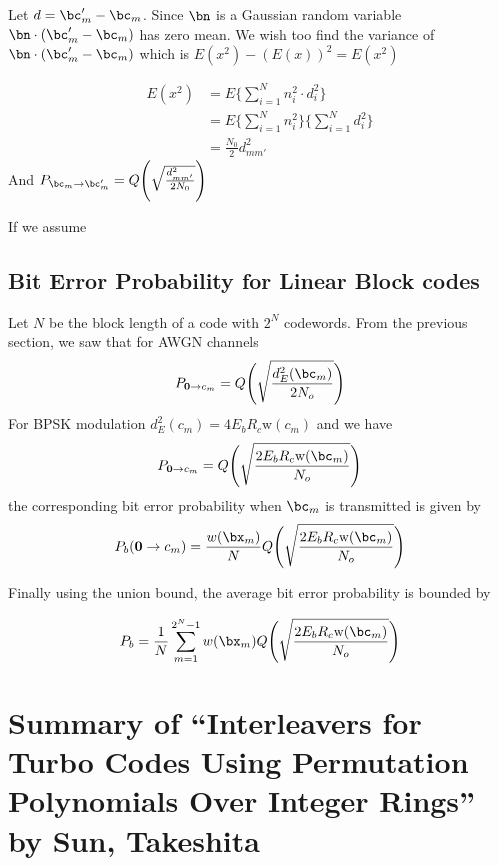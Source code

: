 \documentclass[11pt, oneside, dvipdfmx]{book}
\begin{document}
Let $d=\bc_m'-\bc_m$. Since $\bn $ is a Gaussian random variable $\bn \cdot (\bc_m'-\bc_m) $ has zero mean. We wish too find the variance of $\bn \cdot (\bc_m'-\bc_m)$ which is $E(x^2)-(E(x))^2 = E(x^2)$

\begin{equation}
\begin{split}
 E(x^2)&=E\Bigg\{ \sum_{i=1}^{N} n_i^2 \cdot d_i^2 \Bigg\}\\
 &=E\Bigg\{ \sum_{i=1}^{N} n_i^2  \Bigg\}\Bigg\{ \sum_{i=1}^{N} d_i^2 \Bigg\}\\
 &=\frac{N_0}{2}d_{mm'}^2
\end{split}
\end{equation}
And $P_{\bc_m \rightarrow \bc_m'}=Q \Bigg(\sqrt{\frac{d_{mm'}^2}{2N_0}} \Bigg)$

If we assume
\section{Bit Error Probability for Linear Block codes}
Let $N$ be the block length of a code with $2^N$ codewords. 
From the previous section, we saw that for AWGN channels 
\begin{equation}
 P_{\mathbf{0} \rightarrow c_m} = Q\Bigg(\sqrt{\frac{d^2_E(\bc_m)}{2N_o}}\Bigg)
 \label{pepAWGN}
\end{equation}
For BPSK modulation $d^2_E(c_m) = 4E_bR_c\text{w}(c_m)$ and we have 
\begin{equation}
 P_{\mathbf{0} \rightarrow c_m} = Q\Bigg(\sqrt{\frac{2E_bR_c\text{w}(\bc_m)}{N_o}}\Bigg)
 \label{pepBPSK}
\end{equation}
the corresponding bit error probability when $\bc_m$ is transmitted is given by 
\begin{equation}
P_b(\mathbf{0}\rightarrow c_m) =\frac{w(\bx_m)}{N} Q\Bigg(\sqrt{\frac{2E_bR_c\text{w}(\bc_m)}{N_o}}\Bigg)
\end{equation}

Finally using the union bound, the average bit error probability is bounded by

\begin{equation}
P_b = \frac{1}{N} \sum_{m=1}^{2^{N}-1} w(\bx_m)Q\Bigg(\sqrt{\frac{2E_bR_c\text{w}(\bc_m)}{N_o}}\Bigg)
\end{equation}


\chapter{Summary of ``Interleavers for Turbo Codes Using Permutation
Polynomials Over Integer Rings'' by Sun, Takeshita }
\end{document}
